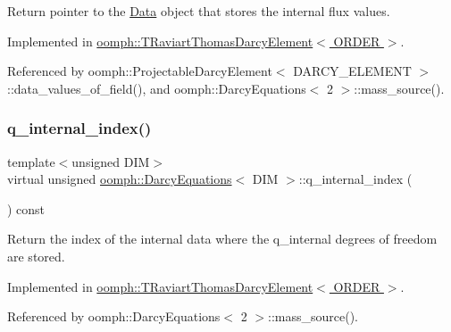 Return pointer to the \hyperlink{classoomph_1_1Data}{Data} object that stores the internal flux values. 



Implemented in \hyperlink{classoomph_1_1TRaviartThomasDarcyElement_a3ee981ece6c2ac5a61a1fc5c75159496}{oomph\+::\+T\+Raviart\+Thomas\+Darcy\+Element$<$ O\+R\+D\+E\+R $>$}.



Referenced by oomph\+::\+Projectable\+Darcy\+Element$<$ D\+A\+R\+C\+Y\+\_\+\+E\+L\+E\+M\+E\+N\+T $>$\+::data\+\_\+values\+\_\+of\+\_\+field(), and oomph\+::\+Darcy\+Equations$<$ 2 $>$\+::mass\+\_\+source().

\mbox{\label{classoomph_1_1DarcyEquations_a84f8df62f86028a3519df586a18a3d20}} 
\subsubsection{\texorpdfstring{q\+\_\+internal\+\_\+index()}{q\_internal\_index()}}
{\footnotesize\ttfamily template$<$unsigned D\+IM$>$ \\
virtual unsigned \hyperlink{classoomph_1_1DarcyEquations}{oomph\+::\+Darcy\+Equations}$<$ D\+IM $>$\+::q\+\_\+internal\+\_\+index (\begin{DoxyParamCaption}{ }\end{DoxyParamCaption}) const\hspace{0.3cm}{\ttfamily [pure virtual]}}



Return the index of the internal data where the q\+\_\+internal degrees of freedom are stored. 



Implemented in \hyperlink{classoomph_1_1TRaviartThomasDarcyElement_aabea3c06ebef3cc39e7eb25e5833ae84}{oomph\+::\+T\+Raviart\+Thomas\+Darcy\+Element$<$ O\+R\+D\+E\+R $>$}.



Referenced by oomph\+::\+Darcy\+Equations$<$ 2 $>$\+::mass\+\_\+source().

\mbox{\label{classoomph_1_1DarcyEquations_a17e99902b01ea42312fa6148a796255f}} 
